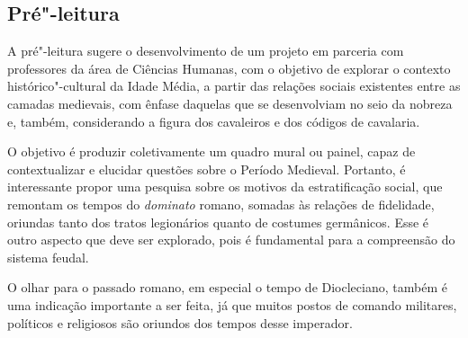 \documentclass[11pt]{extarticle}
\begin{document}
\subsection{Pré"-leitura}


A pré"-leitura sugere o desenvolvimento de um projeto em
parceria com professores da área de Ciências Humanas, com o objetivo de
explorar o contexto histórico"-cultural da Idade Média, a partir das
relações sociais existentes entre as camadas medievais, com ênfase
daquelas que se desenvolviam no seio da nobreza e, também, considerando
a figura dos cavaleiros e dos códigos de cavalaria.

O objetivo é produzir coletivamente um quadro mural ou painel, capaz de
contextualizar e elucidar questões sobre o Período Medieval. Portanto, é
interessante propor uma pesquisa sobre os motivos da estratificação
social, que remontam os tempos do \emph{dominato} romano, somadas às
relações de fidelidade, oriundas tanto dos tratos legionários quanto de
costumes germânicos. Esse é outro aspecto que deve ser explorado, pois é
fundamental para a compreensão do sistema feudal.

O olhar para o passado romano, em especial o tempo de Diocleciano,
também é uma indicação importante a ser feita, já que muitos postos de
comando militares, políticos e religiosos são oriundos dos tempos desse
imperador.
\end{document}

